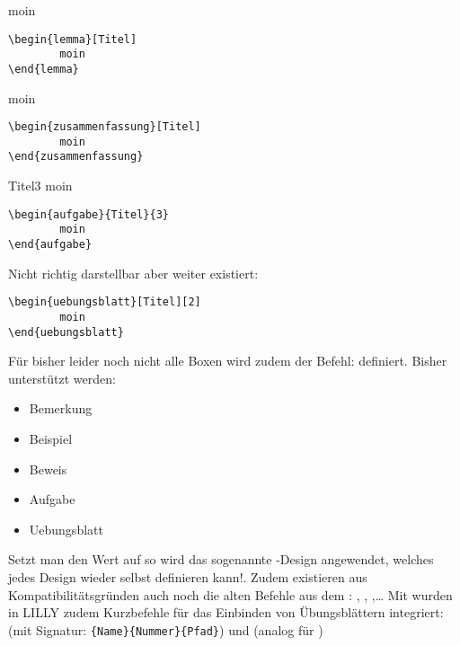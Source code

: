 {\begin{multicols}{2}
\begingroup\begin{lemma}[Titel]
moin
\begin{lstlisting}[language=lLatex]
\begin{lemma}[Titel]
        moin
\end{lemma}\end{lstlisting}
\end{lemma}\endgroup

\begingroup\begin{zusammenfassung}[Titel]
moin
\begin{lstlisting}[language=lLatex]
\begin{zusammenfassung}[Titel]
        moin
\end{zusammenfassung}\end{lstlisting}
\end{zusammenfassung}\endgroup

\begingroup\begin{aufgabe}{Titel}{3}
moin
\begin{lstlisting}[language=lLatex]
\begin{aufgabe}{Titel}{3}
        moin
\end{aufgabe}\end{lstlisting}
\end{aufgabe}\endgroup

Nicht richtig darstellbar aber weiter existiert:
\begin{lstlisting}[language=lLatex]
\begin{uebungsblatt}[Titel][2]
        moin
\end{uebungsblatt}\end{lstlisting}

\end{multicols}}
Für bisher leider noch nicht alle Boxen wird zudem der Befehl:  definiert. Bisher unterstützt werden:
\begin{multicols}{3}
    \begin{itemize}[label=$\diamond$]\narrowitems
        \item Bemerkung
        \item Beispiel
        \item Beweis
        \item Aufgabe
        \item Uebungsblatt
    \end{itemize}
\end{multicols}
Setzt man den Wert auf  so wird das sogenannte -Design angewendet, welches jedes Design wieder selbst definieren kann!.\newline
Zudem existieren aus Kompatibilitätsgründen auch noch die alten Befehle aus dem : , , ,\ldots\medskip\newline
Mit  wurden in LILLY zudem Kurzbefehle für das Einbinden von Übungsblättern integriert:
 (mit Signatur: \verb|{Name}{Nummer}{Pfad}|) und  (analog für )\normalfont

